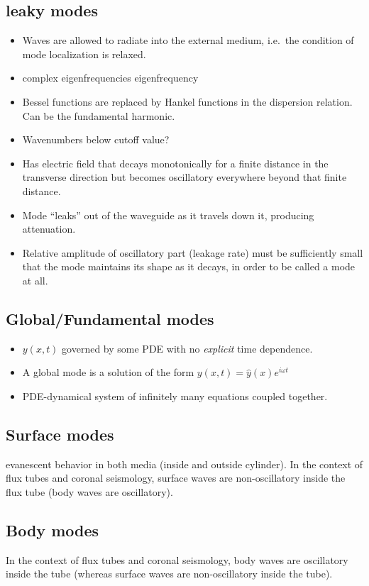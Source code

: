 \documentclass{article}
\begin{document}
\subsection{leaky modes}
\begin{itemize}
    \item Waves are allowed to radiate into the external medium,
        i.e.\ the condition of mode localization is relaxed.
    \item complex eigenfrequencies eigenfrequency
    \item Bessel functions are replaced by Hankel functions in the
        dispersion relation. Can be the fundamental harmonic.
    \item Wavenumbers below cutoff value?
    \item Has electric field that decays monotonically for a finite
        distance in the transverse direction but becomes oscillatory
        everywhere beyond that finite distance.
    \item Mode ``leaks'' out of
        the waveguide as it travels down it, producing attenuation.
    \item Relative amplitude of oscillatory part (leakage rate)
        must be sufficiently small that the mode maintains its
        shape as it decays, in order to be called a mode at all.
\end{itemize}
\subsection{Global/Fundamental modes}
\begin{itemize}
    \item $y(x,t)$ governed by some PDE with no \emph{explicit} time dependence.
    \item A global mode is a solution of the form
        $y(x,t) = \hat{y}(x)e^{i\omega t}$
    \item PDE-dynamical system of infinitely many equations coupled together.
\end{itemize}
\subsection{Surface modes}
evanescent behavior in both media (inside and outside cylinder).
In the context of flux tubes and coronal seismology, surface waves are
non-oscillatory inside the flux tube (body waves are oscillatory).
\subsection{Body modes}
In the context of flux tubes and coronal seismology,
body waves are oscillatory inside the tube (whereas surface waves are
non-oscillatory inside the tube).
\end{document}
